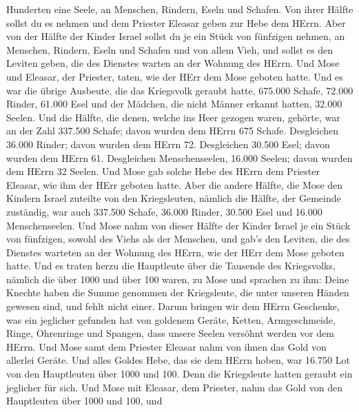 Hunderten eine Seele, an Menschen, Rindern, Eseln und Schafen.
 Von ihrer Hälfte sollst du es nehmen und dem Priester
Eleasar geben zur Hebe dem HErrn.  Aber von der Hälfte der
Kinder Israel sollst du je ein Stück von fünfzigen nehmen, an Menschen,
Rindern, Eseln und Schafen und von allem Vieh, und sollst es den Leviten
geben, die des Dienstes warten an der Wohnung des HErrn. 
Und Mose und Eleasar, der Priester, taten, wie der HErr dem Mose geboten
hatte.  Und es war die übrige Ausbeute, die das Kriegsvolk
geraubt hatte, 675.000 Schafe,  72.000 Rinder,
 61.000 Esel  und der Mädchen, die nicht
Männer erkannt hatten, 32.000 Seelen.  Und die Hälfte, die
denen, welche ins Heer gezogen waren, gehörte, war an der Zahl 337.500
Schafe;  davon wurden dem HErrn 675 Schafe. 
Desgleichen 36.000 Rinder; davon wurden dem HErrn 72. 
Desgleichen 30.500 Esel; davon wurden dem HErrn 61. 
Desgleichen Menschenseelen, 16.000 Seelen; davon wurden dem HErrn 32
Seelen.  Und Mose gab solche Hebe des HErrn dem Priester
Eleasar, wie ihm der HErr geboten hatte.  Aber die andere
Hälfte, die Mose den Kindern Israel zuteilte von den Kriegsleuten,
 nämlich die Hälfte, der Gemeinde zuständig, war auch
337.500 Schafe,  36.000 Rinder,  30.500 Esel
 und 16.000 Menschenseelen.  Und Mose nahm von
dieser Hälfte der Kinder Israel je ein Stück von fünfzigen, sowohl des
Viehs als der Menschen, und gab's den Leviten, die des Dienstes warteten
an der Wohnung des HErrn, wie der HErr dem Mose geboten hatte.
 Und es traten herzu die Hauptleute über die Tausende des
Kriegsvolks, nämlich die über 1000 und über 100 waren, zu Mose
 und sprachen zu ihm: Deine Knechte haben die Summe
genommen der Kriegsleute, die unter unseren Händen gewesen sind, und
fehlt nicht einer.  Darum bringen wir dem HErrn Geschenke,
was ein jeglicher gefunden hat von goldenem Geräte, Ketten,
Armgeschmeide, Ringe, Ohrenringe und Spangen, dass unsere Seelen
versöhnt werden vor dem HErrn.  Und Mose samt dem Priester
Eleasar nahm von ihnen das Gold von allerlei Geräte.  Und
alles Goldes Hebe, das sie dem HErrn hoben, war 16.750 Lot von den
Hauptleuten über 1000 und 100.  Denn die Kriegsleute hatten
geraubt ein jeglicher für sich.  Und Mose mit Eleasar, dem
Priester, nahm das Gold von den Hauptleuten über 1000 und 100, und
